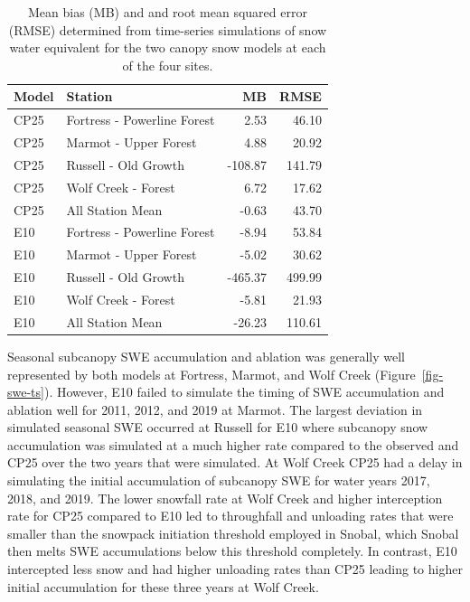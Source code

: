 \documentclass[
  letterpaper,
]{tex/uofsthesis-cs}
\begin{document}
\begin{longtable}[]{@{}llrr@{}}

\caption{\label{tbl-swe-mb}Mean bias (MB) and and root mean squared
error (RMSE) determined from time-series simulations of snow water
equivalent for the two canopy snow models at each of the four sites.}

\tabularnewline

\toprule\noalign{}
Model & Station & MB & RMSE \\
\midrule\noalign{}
\endhead
\bottomrule\noalign{}
\endlastfoot
CP25 & Fortress - Powerline Forest & 2.53 & 46.10 \\
CP25 & Marmot - Upper Forest & 4.88 & 20.92 \\
CP25 & Russell - Old Growth & -108.87 & 141.79 \\
CP25 & Wolf Creek - Forest & 6.72 & 17.62 \\
CP25 & All Station Mean & -0.63 & 43.70 \\
E10 & Fortress - Powerline Forest & -8.94 & 53.84 \\
E10 & Marmot - Upper Forest & -5.02 & 30.62 \\
E10 & Russell - Old Growth & -465.37 & 499.99 \\
E10 & Wolf Creek - Forest & -5.81 & 21.93 \\
E10 & All Station Mean & -26.23 & 110.61 \\

\end{longtable}

Seasonal subcanopy SWE accumulation and ablation was generally well
represented by both models at Fortress, Marmot, and Wolf Creek
(Figure~\ref{fig-swe-ts}). However, E10 failed to simulate the timing of
SWE accumulation and ablation well for 2011, 2012, and 2019 at Marmot.
The largest deviation in simulated seasonal SWE occurred at Russell for
E10 where subcanopy snow accumulation was simulated at a much higher
rate compared to the observed and CP25 over the two years that were
simulated. At Wolf Creek CP25 had a delay in simulating the initial
accumulation of subcanopy SWE for water years 2017, 2018, and 2019. The
lower snowfall rate at Wolf Creek and higher interception rate for CP25
compared to E10 led to throughfall and unloading rates that were smaller
than the snowpack initiation threshold employed in Snobal, which Snobal
then melts SWE accumulations below this threshold completely. In
contrast, E10 intercepted less snow and had higher unloading rates than
CP25 leading to higher initial accumulation for these three years at
Wolf Creek.
\end{document}
